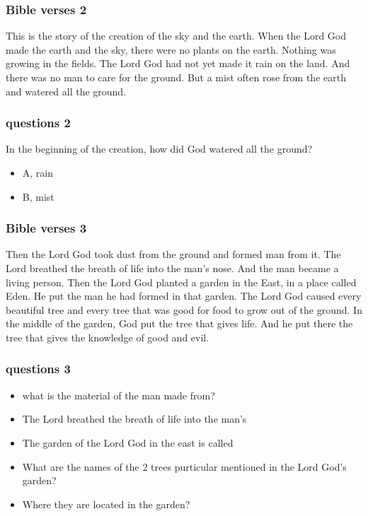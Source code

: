 \documentclass{beamer}
\begin{document}
\begin{frame}
\frametitle{Bible verses 2}
This is the story of the creation of the sky and the earth. When the Lord God made the earth and the sky,  there were no plants on the earth. Nothing was growing in the fields. The Lord God had not yet made it rain on the land. And there was no man to care for the ground.  But a mist often rose from the earth and watered all the ground.
\end{frame}


\begin{frame}
\frametitle{questions 2}

In the beginning of the creation, how did God watered all the ground?
\begin{itemize}
\item A, rain
\item B, mist
\end{itemize}
\end{frame}


\begin{frame}
\frametitle{Bible verses 3}
Then the Lord God took dust from the ground and formed man from it. The Lord breathed the breath of life into the man’s nose. And the man became a living person. Then the Lord God planted a garden in the East, in a place called Eden. He put the man he had formed in that garden. The Lord God caused every beautiful tree and every tree that was good for food to grow out of the ground. In the middle of the garden, God put the tree that gives life. And he put there the tree that gives the knowledge of good and evil.

\end{frame}


\begin{frame}
\frametitle{questions 3}
\begin{itemize}
\item what is the material of the man made from?
\item The Lord breathed the breath of life into the man’s 
\item The garden of the Lord God in the east is called
\item What are the names of the 2 trees purticular mentioned in the Lord God's garden? 
\item Where they are located in the garden?
\end{itemize}


\end{frame}
\end{document}
